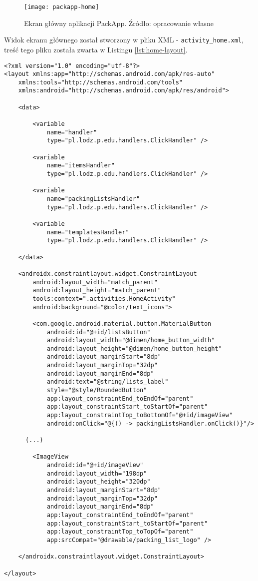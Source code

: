 \documentclass[a4paper,12pt]{article}
\begin{document}
\begin{figure}[H]
    \centering
    \texttt{[image: packapp-home]}
    \caption{Ekran główny aplikacji PackApp. Źródło: opracowanie własne}
    \label{fig:packapp-home}
\end{figure}
\newpage
Widok ekranu głównego został stworzony w pliku XML - \texttt{activity\_home.xml}, treść tego pliku została zwarta w Listingu \ref{lst:home-layout}.

\begin{lstlisting}[caption=Fragment widoku ekranu głównego aplikacji,label={lst:home-layout}]
<?xml version="1.0" encoding="utf-8"?>
<layout xmlns:app="http://schemas.android.com/apk/res-auto"
    xmlns:tools="http://schemas.android.com/tools"
    xmlns:android="http://schemas.android.com/apk/res/android">

    <data>

        <variable
            name="handler"
            type="pl.lodz.p.edu.handlers.ClickHandler" />

        <variable
            name="itemsHandler"
            type="pl.lodz.p.edu.handlers.ClickHandler" />

        <variable
            name="packingListsHandler"
            type="pl.lodz.p.edu.handlers.ClickHandler" />

        <variable
            name="templatesHandler"
            type="pl.lodz.p.edu.handlers.ClickHandler" />

    </data>

    <androidx.constraintlayout.widget.ConstraintLayout
        android:layout_width="match_parent"
        android:layout_height="match_parent"
        tools:context=".activities.HomeActivity"
        android:background="@color/text_icons">

        <com.google.android.material.button.MaterialButton
            android:id="@+id/listsButton"
            android:layout_width="@dimen/home_button_width"
            android:layout_height="@dimen/home_button_height"
            android:layout_marginStart="8dp"
            android:layout_marginTop="32dp"
            android:layout_marginEnd="8dp"
            android:text="@string/lists_label"
            style="@style/RoundedButton"
            app:layout_constraintEnd_toEndOf="parent"
            app:layout_constraintStart_toStartOf="parent"
            app:layout_constraintTop_toBottomOf="@+id/imageView"
            android:onClick="@{() -> packingListsHandler.onClick()}"/>

      (...) 
			
        <ImageView
            android:id="@+id/imageView"
            android:layout_width="198dp"
            android:layout_height="320dp"
            android:layout_marginStart="8dp"
            android:layout_marginTop="32dp"
            android:layout_marginEnd="8dp"
            app:layout_constraintEnd_toEndOf="parent"
            app:layout_constraintStart_toStartOf="parent"
            app:layout_constraintTop_toTopOf="parent"
            app:srcCompat="@drawable/packing_list_logo" />

    </androidx.constraintlayout.widget.ConstraintLayout>
		
</layout>
\end{lstlisting}
\end{document}
